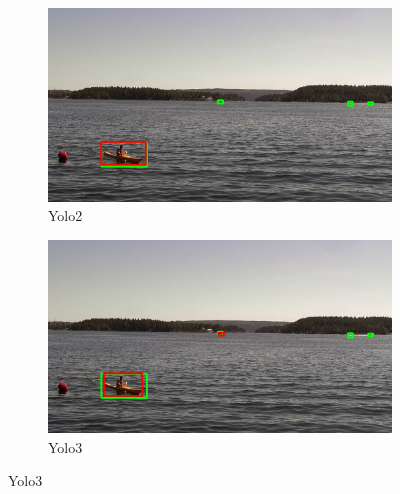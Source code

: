\begin{figure}[h!]
\begin{subfigure}{.5\textwidth}
  \centering
  \includegraphics[width=0.9\linewidth]{results/case_buildings/yolo23/3better/yolo2/selected_07_05_frame0164.jpg}
  \caption{Yolo2}
\end{subfigure}%
\begin{subfigure}{.5\textwidth}
  \centering
  \includegraphics[width=.9\linewidth]{results/case_buildings/yolo23/3better/yolo3/selected_07_05_frame0164.jpg}
  \caption{Yolo3}
\end{subfigure}


\end{figure}
